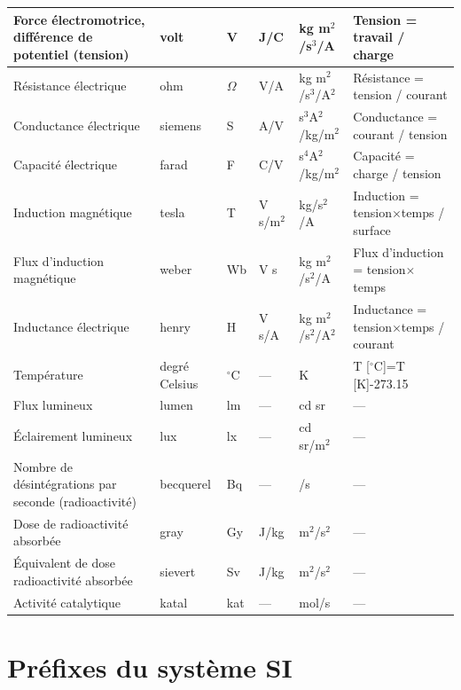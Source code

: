 \begin{center}
\begin{tabular}[t]{>{\pbs\raggedright}p{28mm}
                    >{\pbs\centering}p{17mm}
                    >{\pbs\centering}p{11mm}
                    >{\pbs\centering}p{22mm}
                    >{\pbs\centering}p{22mm}
                    >{\pbs\raggedright}p{32mm}}
\hline
Force électromotrice, différence de potentiel (tension) & volt & V & J/C & kg m$^2$/s$^3$/A & Tension = travail / charge
\\ \hline
Résistance électrique & ohm & $\Omega$ & V/A & kg m$^2$/s$^3$/A$^2$ & Résistance =  tension / courant
\\ \hline
Conductance électrique & siemens & S	& A/V & s$^3$A$^2$/kg/m$^2$ & Conductance = courant / tension
\\ \hline
Capacité électrique & farad & F & C/V & s$^4$A$^2$/kg/m$^2$ & Capacité = charge / tension
\\ \hline
Induction magnétique & tesla & T	& V s/m$^2$ & kg/s$^2$/A & Induction = tension$\times$temps / surface
\\ \hline
Flux d'induction magnétique & weber & Wb	& V s & kg m$^2$/s$^2$/A & Flux d'induction = tension$\times$temps
\\ \hline
Inductance électrique & henry & H & V s/A & kg m$^2$/s$^2$/A$^2$ & Inductance = tension$\times$temps / courant
\\ \hline
Température & degré Celsius & $^{\circ}$C & --- & K & T [$^{\circ}$C]=T [K]-273.15
\\ \hline
Flux lumineux & lumen & lm & --- & cd sr & ---
\\ \hline
Éclairement lumineux & lux & lx & --- & cd sr/m$^2$ & ---
\\ \hline
Nombre de désintégrations par seconde (radioactivité) & becquerel & Bq & --- & 1/s & ---
\\ \hline
Dose de radioactivité absorbée & gray & Gy & J/kg & m$^2$/s$^2$ & ---
\\ \hline
Équivalent de dose radioactivité absorbée & sievert & Sv & J/kg & m$^2$/s$^2$ & ---
\\ \hline
Activité catalytique & katal & kat & --- & mol/s & ---
\\ \hline\hline
\end{tabular}
\end{center}


\section{Préfixes du système SI}


